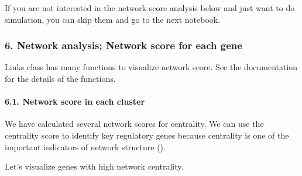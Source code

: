 \documentclass[letterpaper,10pt,english]{sphinxmanual}
\begin{document}
If you are not interested in the network score analysis below and just want to do simulation, you can skip them and go to the next notebook.


\subsubsection{6. Network analysis; Network score for each gene}
\label{\detokenize{notebooks/04_Network_analysis/Network_analysis_with_with_Paul_etal_2015_data:6.-Network-analysis;-Network-score-for-each-gene}}
Links class has many functions to visualize network score. See the documentation for the details of the functions.


\paragraph{6.1. Network score in each cluster}
\label{\detokenize{notebooks/04_Network_analysis/Network_analysis_with_with_Paul_etal_2015_data:6.1.-Network-score-in-each-cluster}}
We have calculated several network scores for centrality. We can use the centrality score to identify key regulatory genes because centrality is one of the important indicators of network structure ().

Let’s visualize genes with high network centrality.

{
%
\begin{sphinxVerbatim}[commandchars=\\\{\}]
\llap{\color{nbsphinxin}[44]:\,\hspace{\fboxrule}\hspace{\fboxsep}}
\end{sphinxVerbatim}
}
\end{document}
